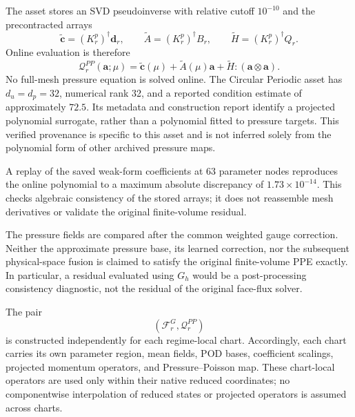 The asset stores an SVD pseudoinverse with relative cutoff $10^{-10}$ and the precontracted arrays
\begin{equation}
 \widetilde{\bm c}=(K_r^p)^\dagger\bm d_r,\qquad
 \widetilde A=(K_r^p)^\dagger B_r,\qquad
 \widetilde H=(K_r^p)^\dagger Q_r.
\end{equation}
Online evaluation is therefore
\begin{equation}
 \mathcal Q_r^{PP}(\bm a;\mu)
 =\widetilde{\bm c}(\mu)+\widetilde A(\mu)\bm a+
   \widetilde H:(\bm a\otimes\bm a).
 \label{eq:app_pressure_poisson_map}
\end{equation}
No full-mesh pressure equation is solved online. The Circular Periodic asset has $d_u=d_p=32$, numerical rank 32, and a reported condition estimate of approximately $72.5$. Its metadata and construction report identify a projected polynomial surrogate, rather than a polynomial fitted to pressure targets. This verified provenance is specific to this asset and is not inferred solely from the polynomial form of other archived pressure maps.

A replay of the saved weak-form coefficients at 63 parameter nodes reproduces the online polynomial to a maximum absolute discrepancy of $1.73\times10^{-14}$. This checks algebraic consistency of the stored arrays; it does not reassemble mesh derivatives or validate the original finite-volume residual.

The pressure fields are compared after the common weighted gauge correction. Neither the approximate pressure base, its learned correction, nor the subsequent physical-space fusion is claimed to satisfy the original finite-volume PPE exactly. In particular, a residual evaluated using $G_h$ would be a post-processing consistency diagnostic, not the residual of the original face-flux solver.

The pair
\begin{equation}
    \left(
        \mathcal F_r^G,
        \mathcal Q_r^{PP}
    \right)
\end{equation}
is constructed independently for each regime-local chart.
Accordingly, each chart carries its own parameter region, mean fields,
POD bases, coefficient scalings, projected momentum operators, and
Pressure--Poisson map.
These chart-local operators are used only within their native reduced
coordinates; no componentwise interpolation of reduced states or projected
operators is assumed across charts.
